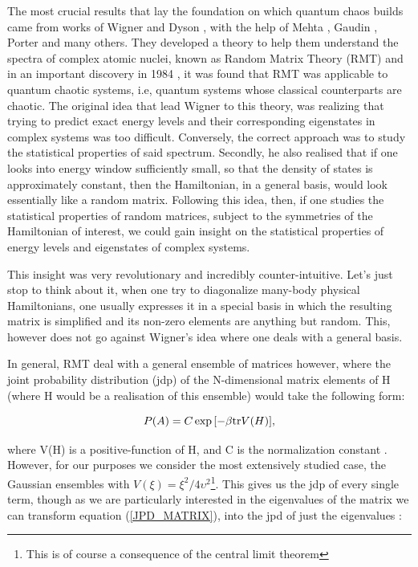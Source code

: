 \documentclass[11pt,a4paper]{article}
\begin{document}
The most crucial results that lay the foundation on which quantum chaos builds came from works of Wigner and Dyson \cite{wigner_statistical_1951,wigner_characteristic_1955,wigner_characteristics_1957,wigner_distribution_1958,dyson_statistical_1962}, with the help of Mehta \cite{mehta_statistical_1960}, Gaudin \cite{mehta_density_1960}, Porter \cite{porter_statistical_1965} and many others. They developed a theory to help them understand the spectra of complex atomic nuclei, known as Random Matrix Theory (RMT) and in an important discovery in 1984 \cite{bohigas_characterization_1984}, it was found that RMT was applicable to quantum chaotic systems, i.e, quantum systems whose classical counterparts are chaotic.
The original idea that lead Wigner to this theory, was realizing that trying to predict exact energy levels and their corresponding eigenstates in complex systems was too difficult. Conversely, the correct approach was to study the statistical properties of said spectrum. Secondly, he also realised that if one looks into energy window sufficiently small, so that the density of states is approximately constant, then the Hamiltonian, in a general basis, would look essentially like a random matrix. Following this idea, then, if one studies the statistical properties of random matrices, subject to the symmetries of the Hamiltonian of interest, we could gain insight on the statistical properties of energy levels and eigenstates of complex systems.

This insight was very revolutionary and incredibly counter-intuitive. Let's just stop to think about it, when one try to diagonalize many-body physical Hamiltonians, one usually expresses it in a special basis in which the resulting matrix is simplified and its non-zero elements are anything but random. This, however does not go against Wigner's idea where one deals with a general basis.

In general, RMT deal with a general ensemble of matrices however, where the joint probability distribution (jdp) of the N-dimensional matrix elements of H (where H would be a realisation of this ensemble) would take the following form:

\begin{equation}\LA{JPD_MATRIX}
    P(A) = C\exp{\left[-\beta\text{tr}V(H)\right]},
\end{equation}

where V(H) is a positive-function of H, and C is the normalization constant \cite{pandey_quantum_2019}. However, for our purposes we consider the most extensively studied case, the Gaussian ensembles with $V(\xi)=\xi^2/4\upsilon^2$\footnote{This is of course a consequence of the central limit theorem}. This gives us the jdp of every single term, though as we are particularly interested in the eigenvalues of the matrix we can transform equation (\ref{JPD_MATRIX}), into the jpd of just the eigenvalues \cite{pandey_quantum_2019,martinez-azcona_decomposing_2025}:
\end{document}
